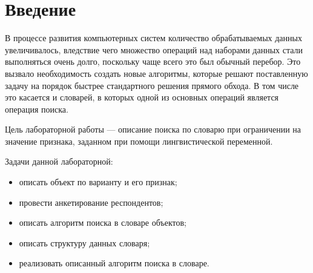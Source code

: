 \chapter*{Введение}

В процессе развития компьютерных систем количество обрабатываемых данных увеличивалось, вледствие чего множество операций над наборами данных стали выполняться очень долго, поскольку чаще всего это был обычный перебор. 
Это вызвало необходимость создать новые алгоритмы, которые решают поставленную задачу на порядок быстрее стандартного решения прямого обхода. 
В том числе это касается и словарей, в которых одной из основных операций является операция поиска.

Цель лабораторной работы --- описание поиска по словарю при ограничении на значение признака, заданном при помощи лингвистической переменной. 

Задачи данной лабораторной:
\begin{itemize}
	\item описать объект по варианту и его признак;
	\item провести анкетирование респондентов;
	\item описать алгоритм поиска в словаре объектов;
	\item описать структуру данных словаря;
	\item реализовать описанный алгоритм поиска в словаре.
\end{itemize}